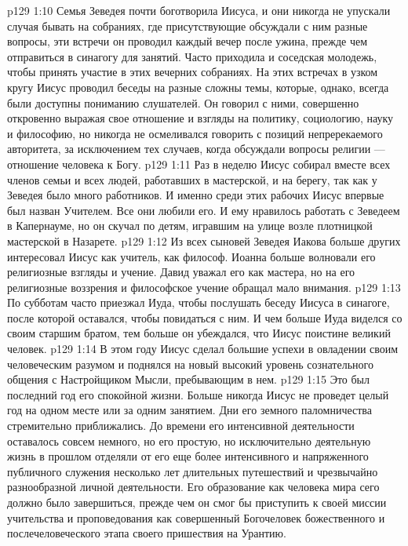 \vs p129 1:10 Семья Зеведея почти боготворила Иисуса, и они никогда не упускали случая бывать на собраниях, где присутствующие обсуждали с ним разные вопросы, эти встречи он проводил каждый вечер после ужина, прежде чем отправиться в синагогу для занятий. Часто приходила и соседская молодежь, чтобы принять участие в этих вечерних собраниях. На этих встречах в узком кругу Иисус проводил беседы на разные сложны темы, которые, однако, всегда были доступны пониманию слушателей. Он говорил с ними, совершенно откровенно выражая свое отношение и взгляды на политику, социологию, науку и философию, но никогда не осмеливался говорить с позиций непререкаемого авторитета, за исключением тех случаев, когда обсуждали вопросы религии --- отношение человека к Богу.
\vs p129 1:11 Раз в неделю Иисус собирал вместе всех членов семьи и всех людей, работавших в мастерской, и на берегу, так как у Зеведея было много работников. И именно среди этих рабочих Иисус впервые был назван Учителем. Все они любили его. И ему нравилось работать с Зеведеем в Капернауме, но он скучал по детям, игравшим на улице возле плотницкой мастерской в Назарете.
\vs p129 1:12 Из всех сыновей Зеведея Иакова больше других интересовал Иисус как учитель, как философ. Иоанна больше волновали его религиозные взгляды и учение. Давид уважал его как мастера, но на его религиозные воззрения и философское учение обращал мало внимания.
\vs p129 1:13 По субботам часто приезжал Иуда, чтобы послушать беседу Иисуса в синагоге, после которой оставался, чтобы повидаться с ним. И чем больше Иуда виделся со своим старшим братом, тем больше он убеждался, что Иисус поистине великий человек.
\vs p129 1:14 \pc В этом году Иисус сделал большие успехи в овладении своим человеческим разумом и поднялся на новый высокий уровень сознательного общения с Настройщиком Мысли, пребывающим в нем.
\vs p129 1:15 Это был последний год его спокойной жизни. Больше никогда Иисус не проведет целый год на одном месте или за одним занятием. Дни его земного паломничества стремительно приближались. До времени его интенсивной деятельности оставалось совсем немного, но его простую, но исключительно деятельную жизнь в прошлом отделяли от его еще более интенсивного и напряженного публичного служения несколько лет длительных путешествий и чрезвычайно разнообразной личной деятельности. Его образование как человека мира сего должно было завершиться, прежде чем он смог бы приступить к своей миссии учительства и проповедования как совершенный Богочеловек божественного и послечеловеческого этапа своего пришествия на Урантию.

